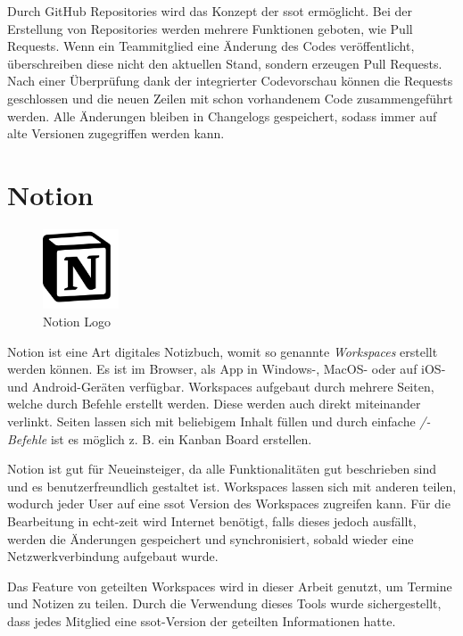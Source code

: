Durch GitHub Repositories wird das Konzept der \gls{ssot} ermöglicht. 
Bei der Erstellung von Repositories werden mehrere Funktionen geboten, wie Pull Requests. 
Wenn ein Teammitglied eine Änderung des Codes veröffentlicht, überschreiben diese nicht den aktuellen Stand, sondern erzeugen Pull Requests.
Nach einer Überprüfung dank der integrierter Codevorschau können die Requests geschlossen und die neuen Zeilen mit schon vorhandenem Code zusammengeführt werden. 
Alle Änderungen bleiben in Changelogs gespeichert, sodass immer auf alte Versionen zugegriffen werden kann.
\cite{githubAbout}

\section{Notion}
\begin{figure}
  \begin{center}
    \includegraphics[width=0.2\textwidth]{pics/logos/notion.png}
   \caption{Notion Logo}
  \end{center}
\end{figure}

Notion ist eine Art digitales Notizbuch, womit so genannte \emph{Workspaces} erstellt werden können. 
Es ist im Browser, als App in Windows-, MacOS- oder auf iOS- und Android-Geräten verfügbar. 
Workspaces aufgebaut durch mehrere Seiten, welche durch Befehle erstellt werden. 
Diese werden auch direkt miteinander verlinkt.
Seiten lassen sich mit beliebigem Inhalt füllen und durch einfache \emph{/-Befehle} ist es möglich z. B. ein Kanban Board erstellen. 
\cite{NotionAbout}

Notion ist gut für Neueinsteiger, da alle Funktionalitäten gut beschrieben sind und es benutzerfreundlich gestaltet ist.
Workspaces lassen sich mit anderen teilen, wodurch jeder User auf eine \gls{ssot} Version des Workspaces zugreifen kann.
Für die Bearbeitung in echt-zeit wird Internet benötigt, falls dieses jedoch ausfällt, werden die Änderungen gespeichert und synchronisiert, sobald wieder eine Netzwerkverbindung aufgebaut wurde.
\cite{NotionAbout}

Das Feature von geteilten Workspaces wird in dieser Arbeit genutzt, um Termine und Notizen zu teilen. 
Durch die Verwendung dieses Tools wurde sichergestellt, dass jedes Mitglied eine \gls{ssot}-Version der geteilten Informationen hatte.

